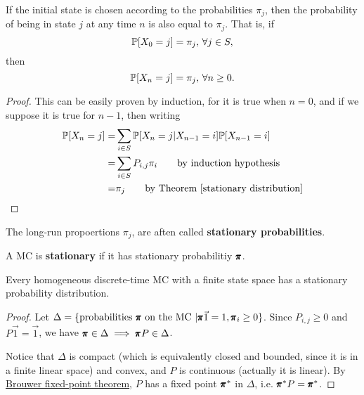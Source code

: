 \begin{proposition}
    If the initial state is chosen according to the probabilities $\pi_j$, then the probability of being in state $j$ at any time $n$ is also equal to $\pi_j$. That is, if 
    $$
    \mathbb{P} [X_0 = j] = \pi_j, \, \forall j \in S,
    $$
    then 
    $$
    \mathbb{P} [X_n = j] = \pi_j, \, \forall n \ge 0.
    $$
    \begin{proof}
        This can be easily proven by induction, for it is true when $n = 0$, and if we suppose it is true for $n-1$, then writing 
        \begin{align*}
            \mathbb{P}[X_n = j] = & \sum_{i \in S} \mathbb{P} [X_n = j | X_{n-1} = i] \mathbb{P} [X_{n-1} = i] \\ 
            = & \sum_{i \in S} P_{i,j} \pi_i \qquad \text{by induction hypothesis} \\ 
            = & \pi_j \qquad \text{by Theorem \ref{stationary distribution}}
        \end{align*}
    \end{proof}
\end{proposition}

\begin{definition}
    The long-run propoertions $\pi_j$, are aften called \textbf{stationary probabilities}.
\end{definition}

\begin{definition}[Stationary MC]
    A MC is \textbf{stationary} if it has stationary probabilitiy $\pmb{\pi}$.
\end{definition}

\begin{theorem}
    \label{existence of stationary probabilities}
    Every homogeneous discrete-time MC with a finite state space has a stationary probability distribution.
    \begin{proof}
        Let $\Delta = \{\text{probabilities } \pmb{\pi} \text{ on the MC } | \pmb{\pi} \vec{1} = 1, \pmb{\pi}_i \ge 0\}$. Since $P_{i,j} \ge 0$ and $P \vec{1} = \vec{1}$, we have $\pmb{\pi} \in \Delta \implies \pmb{\pi} P \in \Delta$.

        Notice that $\Delta$ is compact (which is equivalently closed and bounded, since it is in a finite linear space) and convex, and $P$ is continuous (actually it is linear). By \href{https://en.wikipedia.org/wiki/Brouwer_fixed-point_theorem}{Brouwer fixed-point theorem}, $P$ has a fixed point $\pmb{\pi}^*$ in $\Delta$, i.e. $\pmb{\pi}^* P = \pmb{\pi}^*$.
    \end{proof}
\end{theorem}

